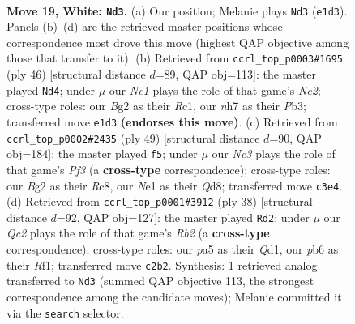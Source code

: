 \documentclass[11pt]{article}
\begin{document}
\clearpage

\begin{figure}[p]\centering
\begin{subfigure}{0.46\textwidth}\centering
\resizebox{\linewidth}{!}{%
\newchessgame
\chessboard[
  setfen={r3qrk1/5pbn/1pn3p1/p1p1P2p/2P3bP/BPN5/P1QP2B1/1R2NRK1 w - - 3 19},
  showmover=false,
  pgfstyle=straightmove, color=movearrow, markmove={e1-d3}
]}
\caption{}
\end{subfigure}\hfill
\begin{subfigure}{0.46\textwidth}\centering
\resizebox{\linewidth}{!}{%
\newchessgame
\chessboard[
  setfen={1r1qr1k1/1p1n1pbp/2b1p1p1/3pP3/Pp3P2/1P2B1PP/4N1B1/2RQR1K1 w - - 0 24},
  showmover=false,
  pgfstyle=straightmove, color=movearrow, markmove={e2-d4}
]}
\caption{}
\end{subfigure}
\\[4pt]
\begin{subfigure}{0.46\textwidth}\centering
\resizebox{\linewidth}{!}{%
\newchessgame
\chessboard[
  setfen={2rq1rk1/1p1b1n1p/3p1ppb/pP1Pp3/P7/1PBB4/3N1PPP/2R1QR1K b - - 8 25},
  showmover=false,
  pgfstyle=straightmove, color=movearrow, markmove={f6-f5}
]}
\caption{}
\end{subfigure}\hfill
\begin{subfigure}{0.46\textwidth}\centering
\resizebox{\linewidth}{!}{%
\newchessgame
\chessboard[
  setfen={1r1r2k1/3q1pbp/bpn1p1p1/2p1P3/2P2P1P/3PB1P1/1R2N1B1/3Q1RK1 w - - 3 20},
  showmover=false,
  pgfstyle=straightmove, color=movearrow, markmove={b2-d2}
]}
\caption{}
\end{subfigure}
\caption{\textbf{Move 19, White: \texttt{Nd3}.} (a) Our position; Melanie plays \texttt{Nd3} (\texttt{e1d3}). Panels (b)--(d) are the retrieved master positions whose correspondence most drove this move (highest QAP objective among those that transfer to it). (b) Retrieved from \texttt{ccrl\_top\_p0003\#1695} (ply 46) [structural distance $d$=89, QAP obj=113]: the master played \texttt{Nd4}; under $\mu$ our \emph{Ne1} plays the role of that game's \emph{Ne2}; cross-type roles: our \emph{B}g2 as their \emph{R}c1, our \emph{n}h7 as their \emph{P}b3; transferred move \texttt{e1d3} \textbf{(endorses this move)}. (c) Retrieved from \texttt{ccrl\_top\_p0002\#2435} (ply 49) [structural distance $d$=90, QAP obj=184]: the master played \texttt{f5}; under $\mu$ our \emph{Nc3} plays the role of that game's \emph{Pf3} (a \textbf{cross-type} correspondence); cross-type roles: our \emph{B}g2 as their \emph{R}c8, our \emph{N}e1 as their \emph{Q}d8; transferred move \texttt{c3e4}. (d) Retrieved from \texttt{ccrl\_top\_p0001\#3912} (ply 38) [structural distance $d$=92, QAP obj=127]: the master played \texttt{Rd2}; under $\mu$ our \emph{Qc2} plays the role of that game's \emph{Rb2} (a \textbf{cross-type} correspondence); cross-type roles: our \emph{p}a5 as their \emph{Q}d1, our \emph{p}b6 as their \emph{R}f1; transferred move \texttt{c2b2}. Synthesis: 1 retrieved analog transferred to \texttt{Nd3} (summed QAP objective 113, the strongest correspondence among the candidate moves); Melanie committed it via the \texttt{search} selector.}
\label{fig:thought-m36}
\end{figure}
\end{document}
